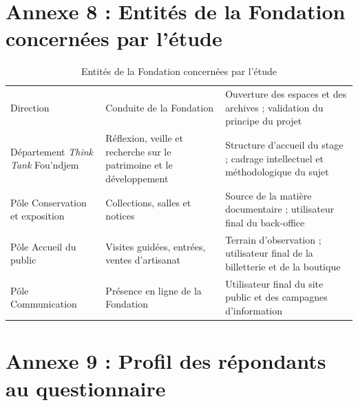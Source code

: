 \cleardoublepage
\chapter*{Annexe 8 : Entités de la Fondation concernées par l'étude}

\vspace{0.3cm}

\begin{table}[htbp]
\centering
\caption{Entités de la Fondation concernées par l'étude}
\label{tab:entites}
\small
\begin{tabularx}{\textwidth}{|L{3.6cm}|L{4.4cm}|X|}
\hline
{}
 &  &  \\ \hline
Direction & Conduite de la Fondation & Ouverture des espaces et des archives ; validation du principe du projet \\ \hline
Département \emph{Think Tank} Fou'ndjem & Réflexion, veille et recherche sur le patrimoine et le développement & Structure d'accueil du stage ; cadrage intellectuel et méthodologique du sujet \\ \hline
Pôle Conservation et exposition & Collections, salles et notices & Source de la matière documentaire ; utilisateur final du back-office \\ \hline
Pôle Accueil du public & Visites guidées, entrées, ventes d'artisanat & Terrain d'observation ; utilisateur final de la billetterie et de la boutique \\ \hline
Pôle Communication & Présence en ligne de la Fondation & Utilisateur final du site public et des campagnes d'information \\ \hline
\end{tabularx}
\end{table}


\cleardoublepage
\chapter*{Annexe 9 : Profil des répondants au questionnaire}

\vspace{0.3cm}

